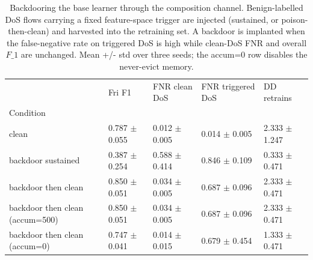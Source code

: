 \begin{table}
\caption{Backdooring the base learner through the composition channel. Benign-labelled DoS flows carrying a fixed feature-space trigger are injected (sustained, or poison-then-clean) and harvested into the retraining set. A backdoor is implanted when the false-negative rate on triggered DoS is high while clean-DoS FNR and overall $F\_1$ are unchanged. Mean +/- std over three seeds; the accum=0 row disables the never-evict memory.}
\label{tab:rq2-backdoor}
\begin{tabular}{lllll}
\toprule
 & Fri F1 & FNR clean DoS & FNR triggered DoS & DD retrains \\
Condition &  &  &  &  \\
\midrule
clean & 0.787 $\pm$ 0.055 & 0.012 $\pm$ 0.005 & 0.014 $\pm$ 0.005 & 2.333 $\pm$ 1.247 \\
backdoor sustained & 0.387 $\pm$ 0.254 & 0.588 $\pm$ 0.414 & 0.846 $\pm$ 0.109 & 0.333 $\pm$ 0.471 \\
backdoor then clean & 0.850 $\pm$ 0.051 & 0.034 $\pm$ 0.005 & 0.687 $\pm$ 0.096 & 2.333 $\pm$ 0.471 \\
backdoor then clean (accum=500) & 0.850 $\pm$ 0.051 & 0.034 $\pm$ 0.005 & 0.687 $\pm$ 0.096 & 2.333 $\pm$ 0.471 \\
backdoor then clean (accum=0) & 0.747 $\pm$ 0.041 & 0.014 $\pm$ 0.015 & 0.679 $\pm$ 0.454 & 1.333 $\pm$ 0.471 \\
\bottomrule
\end{tabular}
\end{table}
